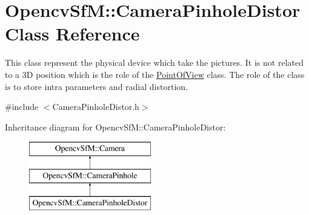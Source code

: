 \hypertarget{class_opencv_sf_m_1_1_camera_pinhole_distor}{
\section{OpencvSfM::CameraPinholeDistor Class Reference}
\label{class_opencv_sf_m_1_1_camera_pinhole_distor}
}


This class represent the physical device which take the pictures. It is not related to a 3D position which is the role of the \hyperlink{class_opencv_sf_m_1_1_point_of_view}{PointOfView} class. The role of the class is to store intra parameters and radial distortion.  




{\ttfamily \#include $<$CameraPinholeDistor.h$>$}

Inheritance diagram for OpencvSfM::CameraPinholeDistor:\begin{figure}[H]
\begin{center}
\leavevmode
\includegraphics[height=3.000000cm]{class_opencv_sf_m_1_1_camera_pinhole_distor}
\end{center}
\end{figure}
